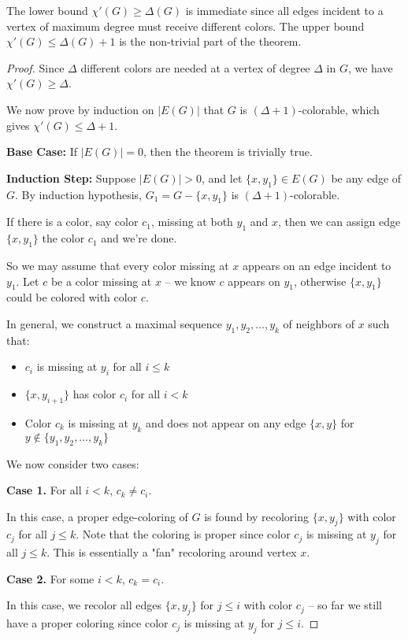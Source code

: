 \documentclass{article}
\theoremstyle{definition}
\begin{document}
The lower bound $\chi'(G) \geq \Delta(G)$ is immediate since all edges incident to a vertex of maximum degree must receive different colors. The upper bound $\chi'(G) \leq \Delta(G) + 1$ is the non-trivial part of the theorem.


\begin{proof}
Since $\Delta$ different colors are needed at a vertex of degree $\Delta$ in $G$, we have $\chi'(G) \geq \Delta$. 

We now prove by induction on $|E(G)|$ that $G$ is $(\Delta + 1)$-colorable, which gives $\chi'(G) \leq \Delta + 1$. 

\textbf{Base Case:} If $|E(G)| = 0$, then the theorem is trivially true.

\textbf{Induction Step:} Suppose $|E(G)| > 0$, and let $\{x, y_1\} \in E(G)$ be any edge of $G$. By induction hypothesis, $G_1 = G - \{x, y_1\}$ is $(\Delta + 1)$-colorable. 

If there is a color, say color $c_1$, missing at both $y_1$ and $x$, then we can assign edge $\{x, y_1\}$ the color $c_1$ and we're done.

So we may assume that every color missing at $x$ appears on an edge incident to $y_1$. Let $c$ be a color missing at $x$ – we know $c$ appears on $y_1$, otherwise $\{x, y_1\}$ could be colored with color $c$.

In general, we construct a maximal sequence $y_1, y_2, \ldots, y_k$ of neighbors of $x$ such that:
\begin{itemize}
\item $c_i$ is missing at $y_i$ for all $i \leq k$
\item $\{x, y_{i+1}\}$ has color $c_i$ for all $i < k$
\item Color $c_k$ is missing at $y_k$ and does not appear on any edge $\{x, y\}$ for $y \not\in \{y_1, y_2, \ldots, y_k\}$
\end{itemize}

We now consider two cases:

\textbf{Case 1.} For all $i < k$, $c_k \neq c_i$. 

In this case, a proper edge-coloring of $G$ is found by recoloring $\{x, y_j\}$ with color $c_j$ for all $j \leq k$. Note that the coloring is proper since color $c_j$ is missing at $y_j$ for all $j \leq k$. This is essentially a "fan" recoloring around vertex $x$.


\textbf{Case 2.} For some $i < k$, $c_k = c_i$. 

In this case, we recolor all edges $\{x, y_j\}$ for $j \leq i$ with color $c_j$ – so far we still have a proper coloring since color $c_j$ is missing at $y_j$ for $j \leq i$. 


\end{proof}
\end{document}
